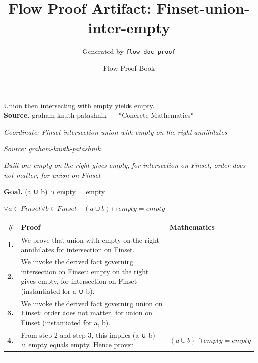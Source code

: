 \documentclass[11pt]{article}
\title{Flow Proof Artifact: Finset-union-inter-empty}
\author{Generated by \texttt{flow doc proof}}
\date{Flow Proof Book}
\theoremstyle{definition}
\begin{document}
\maketitle
Union then intersecting with empty yields empty.\\[0.5em]
\textbf{Source.} graham-knuth-patashnik — *Concrete Mathematics*\\[0.5em]
\bigskip
{}\par
\smallskip\noindent\textit{Coordinate: Finset \cdot intersection \cdot union with empty on the right annihilates}\par
\smallskip\noindent\textit{Source: graham-knuth-patashnik}\par
\smallskip\noindent\textit{Built on: empty on the right gives empty, for intersection on Finset, order does not matter, for union on Finset}\par
\medskip
\noindent\textbf{Goal.} (a ∪ b) ∩ empty = empty\par
\noindent$\displaystyle \forall a \in Finset \forall b \in Finset\quad (a ∪ b) ∩ empty = empty$\par
\medskip
\noindent
\begin{tabular}{@{} >{\raggedright\arraybackslash}p{} >{\raggedright\arraybackslash}p{} >{\raggedleft\arraybackslash}p{} @{}}
\textbf{\#} & \textbf{Proof} & \textbf{Mathematics} \\
\midrule
\textbf{1.} & We prove that union with empty on the right annihilates for intersection on Finset. & \\[0.45em]
\textbf{2.} & We invoke the derived fact governing intersection on Finset: empty on the right gives empty, for intersection on Finset (instantiated for a ∪ b). & \\[0.45em]
\textbf{3.} & We invoke the derived fact governing union on Finset: order does not matter, for union on Finset (instantiated for a, b). & \\[0.45em]
\textbf{4.} & From step 2 and step 3, this implies (a ∪ b) ∩ empty equals empty. Hence proven. & $\displaystyle (a ∪ b) ∩ empty = empty$ \\[0.45em]
\bottomrule
\end{tabular}
\label{thm:Finset-intersection-union_with_empty_on_the_right_annihilates}
\par\medskip\hrule
\end{document}
